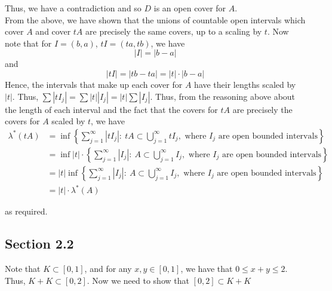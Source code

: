 \documentclass[12pt]{article}
\newenvironment{problem}[2][Problem]{\begin{trivlist}
\item[\hskip \labelsep {\bfseries #1}\hskip \labelsep {\bfseries #2.}]}{\end{trivlist}}
\begin{document}
Thus, we have a contradiction and so $D$ is an open cover for $A$.\\

From the above, we have shown that the unions of countable open intervals which cover $A$ and cover $tA$ are precisely the same covers, up to a scaling by $t$. Now note that for $I = (b, a)$, $tI = (ta, tb)$, we have $$|I| = |b - a|$$ and $$|tI| = |tb - ta| = |t| \cdot |b-a|$$ Hence, the intervals that make up each cover for $A$ have their lengths scaled by $|t|$. Thus, $\sum |tI_j| = \sum |t| |I_j| = |t| \sum |I_j|$. Thus, from the reasoning above about the length of each interval and the fact that the covers for $tA$ are precisely the covers for $A$ scaled by $t$, we have
\begin{align*}
\lambda^*(tA) &= \inf \left\{\sum_{j=1}^{\infty} |tI_j|: \ tA \subset \bigcup_{j=1}^{\infty} tI_j, \text{ where } I_j \text{ are open bounded intervals}\right\}\\
&= \inf |t| \cdot \left\{\sum_{j=1}^{\infty} |I_j|: \ A \subset \bigcup_{j=1}^{\infty} I_j, \text{ where } I_j \text{ are open bounded intervals}\right\}\\
&= |t| \inf \left\{\sum_{j=1}^{\infty} |I_j|: \ A \subset \bigcup_{j=1}^{\infty} I_j, \text{ where } I_j \text{ are open bounded intervals}\right\}\\
&= |t| \cdot \lambda^*(A)
\end{align*}

as required.

\subsection{Section 2.2}

\begin{problem}{5}
\end{problem}

\begin{problem}{6}
\end{problem}

Note that $K \subset [0, 1]$, and for any $x, y \in [0, 1]$, we have that $0 \leq x + y \leq 2$. Thus, $K + K \subset [0, 2]$. Now we need to show that $[0, 2] \subset K + K$
\end{document}
